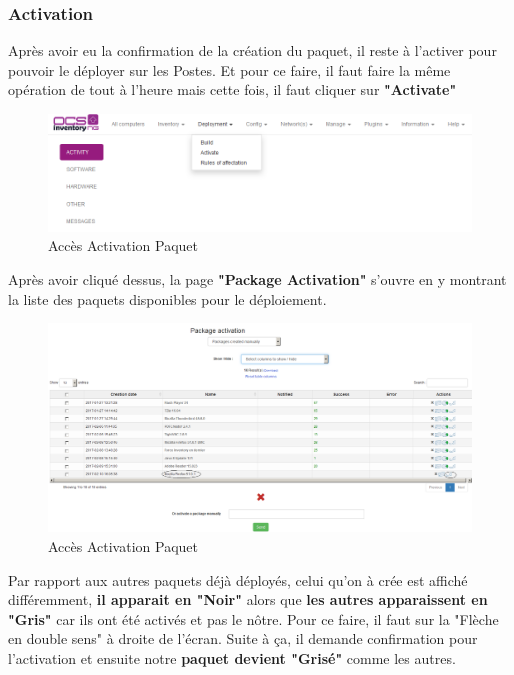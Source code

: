 \documentclass[11pt,a4paper,oneside]{article}
\begin{document}
\subsubsection{Activation}

Après avoir eu la confirmation de la création du paquet, il reste à l'activer pour pouvoir le déployer sur les Postes. Et pour ce faire, il faut faire la même opération de tout à l'heure mais cette fois, il faut cliquer sur \textbf{"Activate"}

\begin{figure}[hbtp]
\centering
\includegraphics[scale=0.7]{Script/Deploiement1.PNG}
\caption{Accès Activation Paquet}
\end{figure}

Après avoir cliqué dessus, la page \textbf{"Package Activation"} s'ouvre en y montrant la liste des paquets disponibles pour le déploiement.

\begin{figure}[hbtp]
\centering
\includegraphics[scale=0.4]{Script/Activation2.PNG}
\caption{Accès Activation Paquet}
\end{figure}
 
Par rapport aux autres paquets déjà déployés, celui qu'on à crée est affiché différemment, \textbf{il apparait en "Noir"} alors que \textbf{les autres apparaissent en "Gris"} car ils ont été activés et pas le nôtre. Pour ce faire, il faut sur la "Flèche en double sens" à droite de l'écran. Suite à ça, il demande confirmation pour l'activation et ensuite notre \textbf{paquet devient "Grisé"} comme les autres.
\newpage
\end{document}
